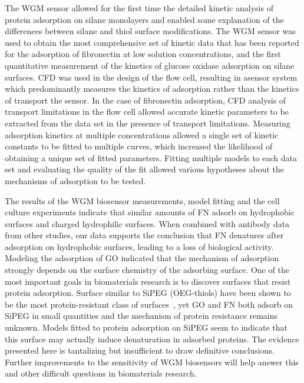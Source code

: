 The WGM sensor allowed for the first time the detailed kinetic analysis
of protein adsorption on silane monolayers and enabled some explanation
of the differences between silane and thiol surface modifications.
The WGM sensor was used to obtain the most comprehensive set of kinetic
data that has been reported for the adsorption of fibronectin at low
solution concentrations, and the first quantitative measurement of
the kinetics of glucose oxidase adsorption on silane surfaces. CFD
was used in the design of the flow cell, resulting in asensor system
which predominantly measures the kinetics of adsorption rather than
the kinetics of transport the sensor. In the case of fibronectin adsorption,
CFD analysis of transport limitations in the flow cell allowed accurate
kinetic parameters to be extracted from the data set in the presence
of transport limitations. Measuring adsorption kinetics at multiple
concentrations allowed a single set of kinetic constants to be fitted
to multiple curves, which increased the likelihood of obtaining a
unique set of fitted parameters. Fitting multiple models to each data
set and evaluating the quality of the fit allowed various hypotheses
about the mechanisms of adsorption to be tested.

The results of the WGM biosensor measurements, model fitting and the
cell culture experiments indicate that similar amounts of FN adsorb
on hydrophobic surfaces and charged hydrophilic surfaces. When combined
with antibody data from other studies, our data supports the conclusion
that FN denatures after adsorption on hydrophobic surfaces, leading
to a loss of biological activity. Modeling the adsorption of GO indicated
that the mechanism of adsorption strongly depends on the surface chemistry
of the adsorbing surface. One of the most important goals in biomaterials
research is to discover surfaces that resist protein adsorption. Surface
similar to SiPEG (OEG-thiols) have been shown to be the most protein-resistant
class of surfaces~\cite{Ostuni2001}, yet GO and FN both adsorb on
SiPEG in small quantities and the mechanism of protein resistance
remains unknown. Models fitted to protein adsorption on SiPEG seem
to indicate that this surface may actually induce denaturation in
adsorbed proteins. The evidence presented here is tantalizing but
insufficient to draw definitive conclusions. Further improvements
to the sensitivity of WGM biosensors will help answer this and other
difficult questions in biomaterials research.

